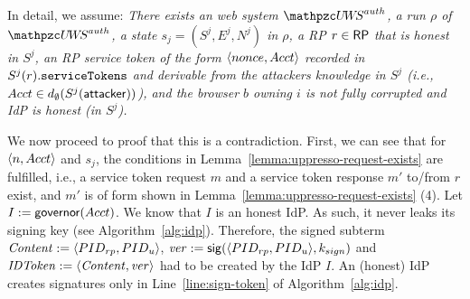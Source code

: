 \documentclass[letterpaper,onecolumn,10pt]{article}
\begin{document}
In detail, we assume: \emph{There exists an \uppresso web 
system $\uppressoauthwebsystem$, a run $\rho$ of 
$\uppressoauthwebsystem$, a state $s_j = (S^j, E^j, N^j)$ 
in $\rho$, a RP $r\in \mathsf{RP}$ that is honest in $S^j$, 
an RP service token of the form $\langle {{}nonce, Acct} \rangle$
recorded in $S^j(r).\mathtt{serviceTokens}$ and derivable from 
the attackers knowledge in $S^j$ (i.e., $Acct \in
d_{\emptyset}(S^j(\mathsf{attacker}))$), and the browser $b$ 
owning $i$ is not fully corrupted and IdP is honest 
(in $S^j$).}

We now proceed to proof that this is a contradiction. 
First, we can see that for $\langle n, Acct\rangle$ and $s_j$, 
the conditions in Lemma~\ref{lemma:uppresso-request-exists} 
are fulfilled, i.e., a service token request $m$ and a 
service token response $m'$ to/from $r$ exist, and $m'$ is 
of form shown in Lemma~\ref{lemma:uppresso-request-exists} (4).
Let $I := \mathsf{governor}(Acct)$. 
We know that $I$ is an honest IdP.
As such, it never leaks its signing key (see Algorithm~\ref{alg:idp}). 
Therefore, the signed subterm $\mathit{Content} := 
\langle {{}PID_{rp}, PID_u} \rangle$, 
$\mathit{ver} := \mathsf{sig}({\langle PID_{rp},PID_u\rangle},{k_{sign}})$ and 
$\mathit{IDToken} := \langle {{}\mathit{Content}, \mathit{ver}} \rangle$ had to be 
created by the IdP $I$. An (honest) IdP creates signatures 
only in Line~\ref{line:sign-token} of Algorithm~\ref{alg:idp}.
\end{document}
